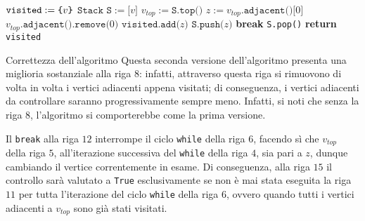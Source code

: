 \documentclass[a4paper, 12pt]{report}
\begin{document}
    \begin{algorithm}[H]
        \caption{
            Seconda versione dell'algoritmo; dato un grafo $G$, diretto o indiretto, rappresentato attraverso liste di adiacenza, e un suo vertice $v$, l'algoritmo restituisce tutti i vertici, raggiungibili attraverso cammini, partendo da $v$.\\
            \textbf{Input}: $G$ un grafo, rappresentato attraverso liste di adiacenza; $v$ un vertice di $G$.\\
            \textbf{Output}: i vertici raggiungibili da $v$.
        }

        \begin{algorithmic}[1]
            \label{findReachableNodes2}
                \State $\texttt{visited} := \verb|{|v\verb|}|$
                \State $\texttt{Stack S} := \texttt{[}v\texttt{]}$
                    \State $v_{top}:=\texttt{S.top()}$
                        \State $z := v_{top}\texttt{.adjacent()[}0\texttt{]}$
                        \State $v_{top}\texttt{.adjacent().remove(}0\texttt{)}$ 
                            \State $\texttt{visited.add(}z\texttt{)}$
                            \State $\texttt{S.push(}z\texttt{)}$
                            \State \textbf{break}
                        \EndIf
                    \EndWhile
                        \State \texttt{S.pop()}
                    \EndIf
                \EndWhile
                \State \textbf{return} \texttt{visited}
            \EndFunction
        \end{algorithmic}
    \end{algorithm}

    \begin{framedobs}{Correttezza dell'algoritmo}
        Questa seconda versione dell'algoritmo presenta una miglioria sostanziale alla riga $8$: infatti, attraverso questa riga si rimuovono di volta in volta i vertici adiacenti appena visitati; di conseguenza, i vertici adiacenti da controllare saranno progressivamente sempre meno. Infatti, si noti che senza la riga $8$, l'algoritmo si comporterebbe come la prima versione.

        Il \texttt{break} alla riga $12$ interrompe il ciclo \texttt{while} della riga $6$, facendo sì che $v_{top}$ della riga $5$, all'iterazione successiva del \texttt{while} della riga $4$, sia pari a $z$, dunque cambiando il vertice correntemente in esame. Di conseguenza, alla riga $15$ il controllo sarà valutato a \texttt{True} esclusivamente se non è mai stata eseguita la riga $11$ per tutta l'iterazione del ciclo \texttt{while} della riga $6$, ovvero quando tutti i vertici adiacenti a $v_{top}$ sono già stati visitati.
    \end{framedobs}
\end{document}
